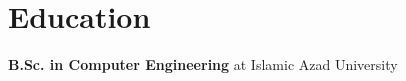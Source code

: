 \documentclass[../main.tex]{subfiles}
\begin{document}
\section{Education}
\begin{category}
    \citembullet \textbf{B.Sc. in Computer Engineering} at Islamic Azad University \hfill \\
\end{category}
\end{document}
